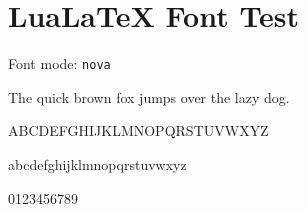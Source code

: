 \documentclass[12pt]{article}
\providecommand{\fontchoice}{nova}
\begin{document}
\section*{LuaLaTeX Font Test}

Font mode: \texttt{\fontchoice}

The quick brown fox jumps over the lazy dog.

ABCDEFGHIJKLMNOPQRSTUVWXYZ

abcdefghijklmnopqrstuvwxyz

0123456789
\end{document}

